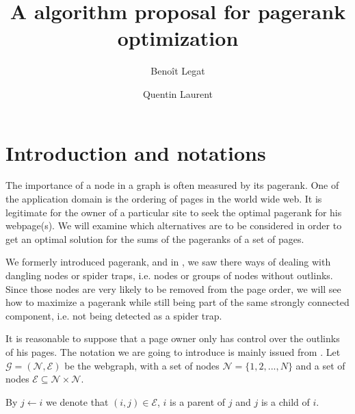 \documentclass{article}
\author{Benoît Legat \and Quentin Laurent}
\title{A algorithm proposal for pagerank optimization}
\newcommand{\1}{\mathbf{1}}
\theoremstyle{definition}
\begin{document}
\maketitle

\section{Introduction and notations}
The importance of a node in a graph is often measured by its pagerank. One of the application domain is the ordering of pages in the world wide web. It is legitimate for the owner of a particular site to seek the optimal pagerank for his webpage(s). We will examine which alternatives are to be considered in order to get an optimal solution for the sums of the pageranks of a set of pages.

We formerly introduced pagerank, and in \cite{leskovec}, we saw there ways of dealing with dangling nodes or spider traps, i.e. nodes or groups of nodes without outlinks. Since those nodes are very likely to be removed from the page order, we will see how to maximize a pagerank while still being part of the same strongly connected component, i.e. not being detected as a spider trap.

It is reasonable to suppose that a page owner only has control over the outlinks of his pages. The notation we are going to introduce is mainly issued from \cite{de2008maximizing}.
Let $\mathcal{G} = (\mathcal{N},\mathcal{E})$ be the webgraph, with a set of nodes  $\mathcal{N} = \{1,2,...,N\}$ and a set of nodes $\mathcal{E}\subseteq \mathcal{N}\times \mathcal{N}$.

By $j \leftarrow i$ we denote that $(i,j)\in \mathcal{E}$, $i$ is a parent of $j$ and $j$ is a child of $i$. 
\end{document}
